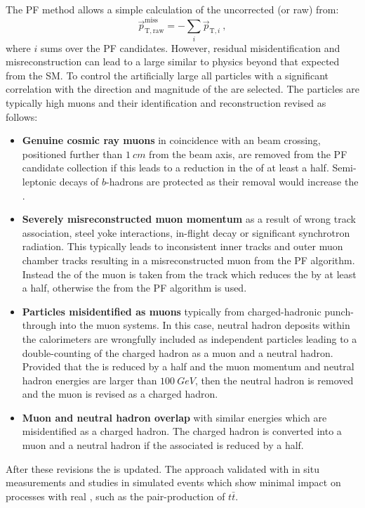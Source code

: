 The PF method allows a simple calculation of the uncorrected (or raw) \ptmiss from:
%
\begin{equation}
    \vec{p}_{\mathrm{T,raw}}^{\mathrm{miss}} = - \sum_{i} \vec{p}_{\mathrm{T},i}\ ,
\end{equation}
%
where $i$ sums over the PF candidates. However, residual misidentification and misreconstruction can lead to a large \ptmiss similar to physics beyond that expected from the SM. To control the artificially large \ptmiss all particles with a significant correlation with the direction and magnitude of the \ptmiss are selected. The particles are typically high \pt muons and their identification and reconstruction revised as follows:
%
\begin{itemize}
    \item \textbf{Genuine cosmic ray muons} in coincidence with an \LHC beam crossing, positioned further than ${\SI{1}{cm}}$ from the beam axis, are removed from the PF candidate collection if this leads to a reduction in the \ptmiss of at least a half. Semi-leptonic decays of $b$-hadrons are protected as their removal would increase the \ptmiss.
    \item \textbf{Severely misreconstructed muon momentum} as a result of wrong track association, steel yoke interactions, in-flight decay or significant synchrotron radiation. This typically leads to inconsistent inner tracks and outer muon chamber tracks resulting in a misreconstructed muon \pt from the PF algorithm. Instead the \pt of the muon is taken from the track which reduces the \ptmiss by at least a half, otherwise the \pt from the PF algorithm is used.
    \item \textbf{Particles misidentified as muons} typically from charged-hadronic punch-through into the muon systems. In this case, neutral hadron deposits within the calorimeters are wrongfully included as independent particles leading to a double-counting of the charged hadron as a muon and a neutral hadron. Provided that the \ptmiss is reduced by a half and the muon momentum and neutral hadron energies are larger than ${\SI{100}{GeV}}$, then the neutral hadron is removed and the muon is revised as a charged hadron.
    \item \textbf{Muon and neutral hadron overlap} with similar energies which are misidentified as a charged hadron. The charged hadron is converted into a muon and a neutral hadron if the associated \ptmiss is reduced by a half.
\end{itemize}
%
After these revisions the \ptmiss is updated. The approach validated with in situ measurements and studies in simulated events which show minimal impact on processes with real \ptmiss, such as the pair-production of $t\bar{t}$.


